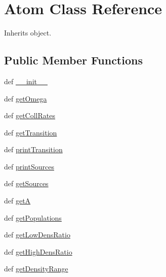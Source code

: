 \hypertarget{classpyneb_1_1core_1_1pynebcore_1_1_atom}{\section{Atom Class Reference}
\label{classpyneb_1_1core_1_1pynebcore_1_1_atom}
}


Inherits object.

\subsection*{Public Member Functions}
\begin{DoxyCompactItemize}
\item 
def \hyperlink{classpyneb_1_1core_1_1pynebcore_1_1_atom_ac775ee34451fdfa742b318538164070e}{\-\_\-\-\_\-init\-\_\-\-\_\-}
\item 
def \hyperlink{classpyneb_1_1core_1_1pynebcore_1_1_atom_aaf6e92dda1e6d1aa7d06098b4e9a4e6d}{get\-Omega}
\item 
def \hyperlink{classpyneb_1_1core_1_1pynebcore_1_1_atom_ab4561af1ba7e3cc0c5323cf1e4d07454}{get\-Coll\-Rates}
\item 
def \hyperlink{classpyneb_1_1core_1_1pynebcore_1_1_atom_acf586a33a19e340d5da3ddd7fcf84f9c}{get\-Transition}
\item 
def \hyperlink{classpyneb_1_1core_1_1pynebcore_1_1_atom_a69ea809ac1bda5a46d5a167ea3c2754c}{print\-Transition}
\item 
def \hyperlink{classpyneb_1_1core_1_1pynebcore_1_1_atom_a0120b7dbd5f911f8b1df2d2cebf6c09c}{print\-Sources}
\item 
def \hyperlink{classpyneb_1_1core_1_1pynebcore_1_1_atom_a13685d48c0180c5463a5dffebcd4fb29}{get\-Sources}
\item 
def \hyperlink{classpyneb_1_1core_1_1pynebcore_1_1_atom_a17192519660871ef6a77e6bdad6f580d}{get\-A}
\item 
def \hyperlink{classpyneb_1_1core_1_1pynebcore_1_1_atom_af24a621cd6fd0b6b4e9d8dd178434976}{get\-Populations}
\item 
def \hyperlink{classpyneb_1_1core_1_1pynebcore_1_1_atom_a380df6d9d345514f05ff70b1c5796797}{get\-Low\-Dens\-Ratio}
\item 
def \hyperlink{classpyneb_1_1core_1_1pynebcore_1_1_atom_a83b623cde68b5b32ab0b711902d1f2ac}{get\-High\-Dens\-Ratio}
\item 
def \hyperlink{classpyneb_1_1core_1_1pynebcore_1_1_atom_afaf855a26eba2f91bc3fd078cb03b7ce}{get\-Density\-Range}
\item 

\end{DoxyCompactItemize}
